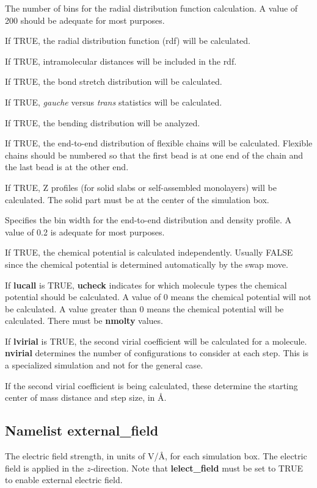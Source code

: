 \documentclass[12pt,letterpaper]{article}
\begin{document}
 The number of bins for the radial
distribution function calculation. A value of 200 should be
adequate for most purposes.

 If TRUE, the radial distribution function (rdf) will be calculated.

 If TRUE, intramolecular distances will be included in the rdf.

 If TRUE, the bond stretch distribution will be calculated.

 If TRUE, \textit{gauche} versus
\textit{trans} statistics will be calculated.

 If TRUE, the bending distribution will be analyzed.

 If TRUE, the end-to-end distribution of
flexible chains will be calculated. Flexible chains should
be numbered so that the first bead is at one end of the
chain and the last bead is at the other end.

 If TRUE, Z profiles (for solid slabs
or self-assembled monolayers) will be calculated. The solid
part must be at the center of the simulation box.

 Specifies the bin width for the
end-to-end distribution and density profile. A value of 0.2
is adequate for most purposes.

 If TRUE, the chemical potential is
calculated independently. Usually FALSE since the chemical
potential is determined automatically by the swap move.

 If {\bf lucall} is TRUE, {\bf ucheck}
indicates for which molecule types the chemical potential
should be calculated. A value of 0 means the chemical
potential will not be calculated. A value greater than 0
means the chemical potential will be calculated. There must
be {\bf nmolty} values.

 If {\bf lvirial} is TRUE, the second
virial coefficient will be calculated for a molecule. {\bf
  nvirial} determines the number of configurations to
consider at each step. This is a specialized simulation and
not for the general case.

 If the second virial
coefficient is being calculated, these determine the
starting center of mass distance and step size, in {\AA}.

\subsection{Namelist \textbf{external\_field}}
 The electric field strength, in
units of V/\AA, for each simulation box. The electric field
is applied in the $z$-direction. Note that {\bf
  lelect\_field} must be set to TRUE to enable external
electric field.
\end{document}
